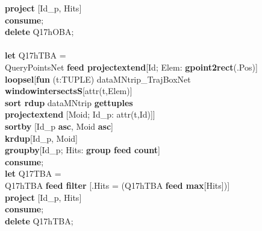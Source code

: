 \documentclass[a4paper]{article}
\newcommand{\op}[1]{\textbf{#1}}
\begin{document}
\begin{scriptsize}
\begin{tabbing}
\>\op{project} [Id\_p, Hits]\\
\op{consume};\\
\op{delete} Q17hOBA;\\
\\
\op{let} Q17hTBA =\\
\>QueryPointsNet \op{feed projectextend}[Id; Elem: \op{gpoint2rect}(.Pos)]\\
\>\op{loopsel}[\op{fun} (t:TUPLE) dataMNtrip\_TrajBoxNet
\op{windowintersectsS}[attr(t,Elem)]\\
\>\>\op{sort rdup} dataMNtrip \op{gettuples}\\
\>\>\op{projectextend} [Moid; Id\_p: attr(t,Id)]]\\
\>\op{sortby} [Id\_p \op{asc}, Moid \op{asc}]\\
\>\op{krdup}[Id\_p, Moid]\\
\>\op{groupby}[Id\_p; Hits: \op{group feed count}]\\
\op{consume};\\
\op{let} Q17TBA =\\
\>Q17hTBA \op{feed filter} [.Hits = (Q17hTBA \op{feed max}[Hits])]\\
\>\op{project} [Id\_p, Hits]\\
\op{consume};\\
\op{delete} Q17hTBA;\\
\end{tabbing}
\end{scriptsize}
\end{document}
